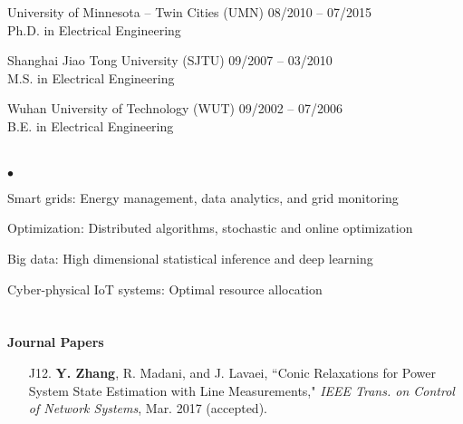 \documentclass[margin,line]{res}
\newenvironment{list2}{
  \begin{list}{$\bullet$}{%
      \setlength{\itemsep}{0in}
      \setlength{\parsep}{0in} \setlength{\parskip}{0in}
      \setlength{\topsep}{0in} \setlength{\partopsep}{0in}
      \setlength{\leftmargin}{0.10in}}}{\end{list}}
\begin{document}
\begin{resume}
University of Minnesota -- Twin Cities (UMN)  \hfill  08/2010 -- 07/2015 \\
Ph.D. in Electrical Engineering 


Shanghai Jiao Tong University (SJTU)  \hfill  09/2007 -- 03/2010\\
M.S. in Electrical Engineering  


Wuhan University of Technology (WUT)   \hfill  09/2002 -- 07/2006\\
B.E. in Electrical Engineering 

\vspace{.2cm}



\section{}
\begin{list2}
\item Smart grids: Energy management, data analytics, and grid monitoring
\item Optimization: Distributed algorithms, stochastic and online optimization
\item Big data: High dimensional statistical inference and deep learning
\item Cyber-physical IoT systems: Optimal resource allocation
\end{list2}



\vspace{.2cm}


\section{}  


{\bf Journal Papers}
\vspace{.2cm}

\begin{enumerate}\setcounter{enumi}{\value{saveenum}}

\item[J12.] \textbf{Y. Zhang}, R. Madani, and J. Lavaei,
``Conic Relaxations for Power System State Estimation with Line Measurements,"
\emph{IEEE Trans. on Control of Network Systems}, Mar. 2017 (accepted).



\end{enumerate}
\end{resume}
\end{document}
